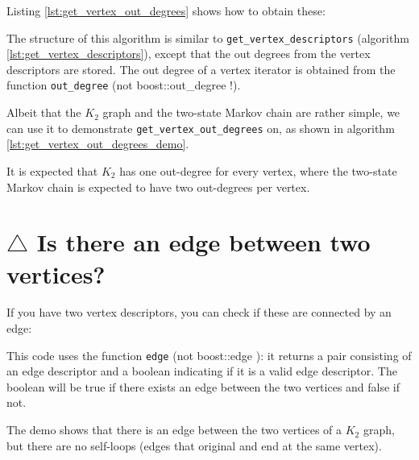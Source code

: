 Listing \ref{lst:get_vertex_out_degrees}
shows how to obtain these:



The structure of this algorithm is similar to 
\verb;get_vertex_descriptors; (algorithm \ref{lst:get_vertex_descriptors}), 
except that the out degrees from the vertex descriptors are stored.
The out degree of a vertex iterator is obtained from 
the function \verb;out_degree; 
(not boost::out\_degree !).
 
Albeit that the $K_{2}$
graph and the two-state Markov chain are rather simple, we can use it to
demonstrate \verb;get_vertex_out_degrees; on, as shown in algorithm 
\ref{lst:get_vertex_out_degrees_demo}.



It is expected that $K_{2}$
has one out-degree for every vertex, where the two-state Markov chain is
expected to have two out-degrees per vertex.

\section{$\triangle$ Is there an edge between two vertices?}
\label{subsec:has_edge_between_vertices}

If you have two vertex descriptors, you can check if these are connected
 by an edge:



This code uses the function \verb;edge; 
(not boost::edge ): 
it returns a pair consisting of an edge descriptor and a boolean indicating
if it is a valid edge descriptor.
The boolean will be true if there exists an edge between the two vertices
and false if not.

The demo shows that there is an edge between the two vertices of a 
$K_{2}$ graph, but there are no self-loops (edges that original and end at the
 same vertex).

